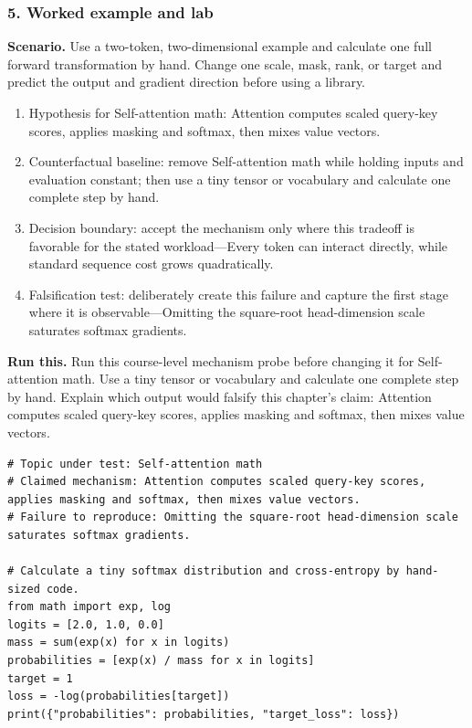 \subsubsection*{5. Worked example and lab}
\textbf{Scenario.} Use a two-token, two-dimensional example and calculate one full forward transformation by hand. Change one scale, mask, rank, or target and predict the output and gradient direction before using a library.
\begin{enumerate}
\item Hypothesis for Self-attention math: Attention computes scaled query-key scores, applies masking and softmax, then mixes value vectors.
\item Counterfactual baseline: remove Self-attention math while holding inputs and evaluation constant; then use a tiny tensor or vocabulary and calculate one complete step by hand.
\item Decision boundary: accept the mechanism only where this tradeoff is favorable for the stated workload—Every token can interact directly, while standard sequence cost grows quadratically.
\item Falsification test: deliberately create this failure and capture the first stage where it is observable—Omitting the square-root head-dimension scale saturates softmax gradients.
\end{enumerate}
\textbf{Run this.} Run this course-level mechanism probe before changing it for Self-attention math. Use a tiny tensor or vocabulary and calculate one complete step by hand. Explain which output would falsify this chapter's claim: Attention computes scaled query-key scores, applies masking and softmax, then mixes value vectors.
\begin{Verbatim}[fontsize=\scriptsize]
# Topic under test: Self-attention math
# Claimed mechanism: Attention computes scaled query-key scores, applies masking and softmax, then mixes value vectors.
# Failure to reproduce: Omitting the square-root head-dimension scale saturates softmax gradients.

# Calculate a tiny softmax distribution and cross-entropy by hand-sized code.
from math import exp, log
logits = [2.0, 1.0, 0.0]
mass = sum(exp(x) for x in logits)
probabilities = [exp(x) / mass for x in logits]
target = 1
loss = -log(probabilities[target])
print({"probabilities": probabilities, "target_loss": loss})
\end{Verbatim}
